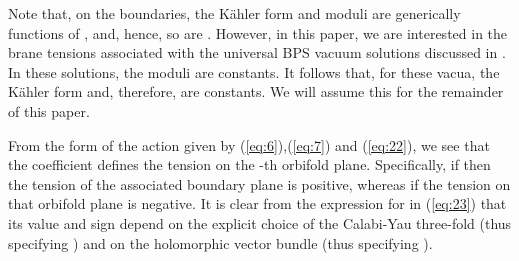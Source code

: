\documentclass[a4paper,12pt]{article}
\numberwithin{equation}{section}
\theoremstyle{plain}
\begin{document}
%
Note that, on the boundaries, the K\"{a}hler form \myHighlight{$\omega$}\coordHE{} and 
moduli \coordHE{} are generically functions of \coordHE{}, \coordHE{} and,
hence, so are \coordHE{}. However, in this paper,
we are interested in the brane tensions associated with the universal BPS
vacuum solutions discussed in \cite{BW1B}. 
In these solutions, the \coordHE{} moduli are
constants. It follows that, for these vacua, the K\"{a}hler form and, therefore, 
\coordHE{} are constants. We will assume this for the remainder of this
paper.

From the form of the action given by (\ref{eq:6}),(\ref{eq:7}) and
(\ref{eq:22}), we see that the coefficient \coordHE{} defines the tension on the
\coordHE{}-th orbifold plane. Specifically, if \coordHE{} then the tension of
the associated boundary plane is positive, whereas if \coordHE{} the
tension on that orbifold plane is negative. It is clear from the expression
for \coordHE{} in (\ref{eq:23}) that its value
and sign depend on the explicit choice of the Calabi-Yau three-fold (thus
specifying \coordHE{}) and on the holomorphic vector bundle \coordHE{} (thus
specifying \coordHE{}). 
\end{document}
